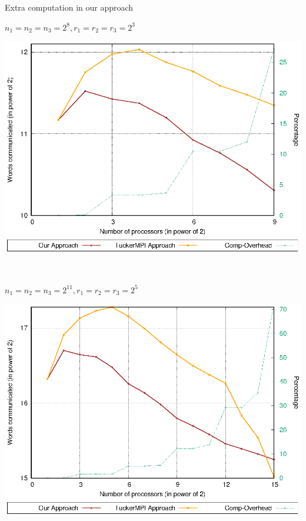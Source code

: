 \documentclass[aspectratio=169]{beamer}
\begin{document}
\begin{frame}{Extra computation in our approach}
	
	\begin{minipage}{0.475\linewidth}
		\begin{block}{$n_1=n_2= n_3=2^{8},r_1=r_2=r_3=2^{3}$}
			\begin{center}
				\includegraphics[scale=0.56]{./A@O-vs-Seq-logscale-comparison-with-comp-8-3.eps}
			\end{center}
		\end{block}
	\end{minipage}$\quad$
	\begin{minipage}{0.475\linewidth}
		\begin{block}{$n_1=n_2= n_3=2^{11},r_1=r_2=r_3=2^{5}$}
			\begin{center}
				\includegraphics[scale=0.56]{./A@O-vs-Seq-logscale-comparison-with-comp-11-5.eps}
			\end{center}
		\end{block}
	\end{minipage}
\end{frame}
\end{document}
